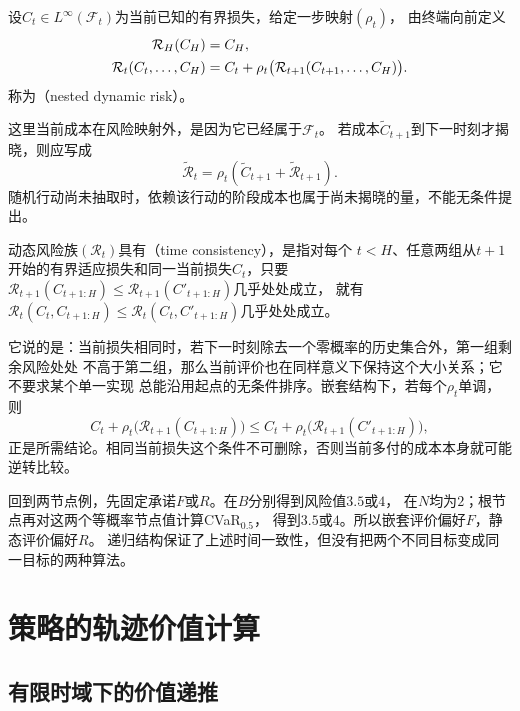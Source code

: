 \begin{definition}[嵌套动态风险]
\label{def:decision-nested-dynamic-risk}
设$C_t\in L^\infty(\mathcal F_t)$为当前已知的有界损失，给定一步映射$(\rho_t)$，
由终端向前定义
\begin{align}
  \mathcal R_H(C_H)&=C_H,\notag\\
  \mathcal R_t(C_t,\ldots,C_H)
  &=C_t+\rho_t\bigl(\mathcal R_{t+1}(C_{t+1},\ldots,C_H)\bigr).
  \label{eq:decision-nested-dynamic-risk}
\end{align}
称为（nested dynamic risk）。
\end{definition}
这里当前成本在风险映射外，是因为它已经属于$\mathcal F_t$。
若成本$\widetilde C_{t+1}$到下一时刻才揭晓，则应写成
\[
  \widetilde{\mathcal R}_t
  =\rho_t(\widetilde C_{t+1}+\widetilde{\mathcal R}_{t+1}).
\]
随机行动尚未抽取时，依赖该行动的阶段成本也属于尚未揭晓的量，不能无条件提出。

\begin{definition}[递归意义下的时间一致性]
\label{def:decision-time-consistency}
动态风险族$(\mathcal R_t)$具有（time consistency），是指对每个
$t<H$、任意两组从$t+1$开始的有界适应损失和同一当前损失$C_t$，只要
$\mathcal R_{t+1}(C_{t+1:H})\leq\mathcal R_{t+1}(C'_{t+1:H})$几乎处处成立，
就有$\mathcal R_t(C_t,C_{t+1:H})\leq\mathcal R_t(C_t,C'_{t+1:H})$几乎处处成立。
\end{definition}
它说的是：当前损失相同时，若下一时刻除去一个零概率的历史集合外，第一组剩余风险处处
不高于第二组，那么当前评价也在同样意义下保持这个大小关系；它不要求某个单一实现
总能沿用起点的无条件排序。嵌套结构下，若每个$\rho_t$单调，则
\[
  C_t+\rho_t\bigl(\mathcal R_{t+1}(C_{t+1:H})\bigr)
  \leq
  C_t+\rho_t\bigl(\mathcal R_{t+1}(C'_{t+1:H})\bigr),
\]
正是所需结论。相同当前损失这个条件不可删除，否则当前多付的成本本身就可能逆转比较。

回到两节点例，先固定承诺$F$或$R$。在$B$分别得到风险值$3.5$或$4$，
在$N$均为$2$；根节点再对这两个等概率节点值计算CVaR$_{0.5}$，
得到$3.5$或$4$。所以嵌套评价偏好$F$，静态评价偏好$R$。
递归结构保证了上述时间一致性，但没有把两个不同目标变成同一目标的两种算法。

\section{策略的轨迹价值计算}
\label{sec:policy-value-evaluation}

\subsection{有限时域下的价值递推}
\label{sec:policy-finite-evaluation}

